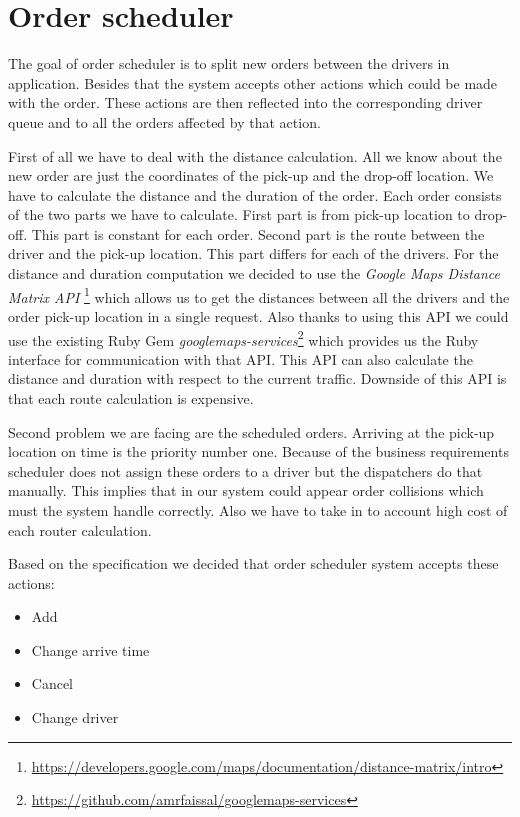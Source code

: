 \section {Order scheduler}

The goal of order scheduler is to split new orders between the drivers in application. Besides that the system accepts other actions which could be made with the order. These actions are then reflected into the corresponding driver queue and to all the orders affected by that action.

First of all we have to deal with the distance calculation. All we know about the new order are just the coordinates of the pick-up and the drop-off location. We have to calculate the distance and the duration of the order. Each order consists of the two parts we have to calculate. First part is from pick-up location to drop-off. This part is constant for each order. Second part is the route between the driver and the pick-up location. This part differs for each of the drivers. For the distance and duration computation we decided to use the \textit{Google Maps Distance Matrix API} \footnote{\url{https://developers.google.com/maps/documentation/distance-matrix/intro}} which allows us to get the distances between all the drivers and the order pick-up location in a single request. Also thanks to using this API we could use the existing Ruby Gem \textit{googlemaps-services}\footnote{\url{https://github.com/amrfaissal/googlemaps-services}} which provides us the Ruby interface for communication with that API. This API can also calculate the distance and duration with respect to the current traffic. Downside of this API is that each route calculation is expensive.

Second problem we are facing are the scheduled orders. Arriving at the pick-up location on time is the priority number one. Because of the business requirements scheduler does not assign these orders to a driver but the dispatchers do that manually. This implies that in our system could appear order collisions which must the system handle correctly. Also we have to take in to account high cost of each router calculation.

Based on the specification we decided that order scheduler system accepts these actions:
\begin{itemize}
	\item Add
	\item Change arrive time
	\item Cancel
	\item Change driver
\end{itemize}


